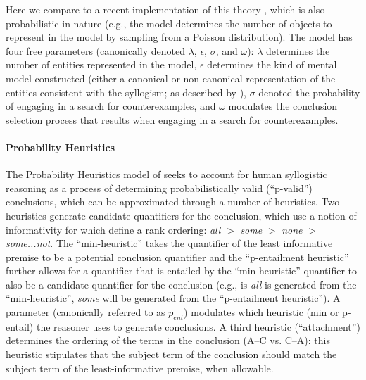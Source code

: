\documentclass[floatsintext, doc]{apa6}
\begin{document}
Here we compare to a recent implementation of this theory \cite<the mReasoner model>{khemlani2013processes}, which is also probabilistic in nature (e.g., the model determines the number of objects to represent in the model by sampling  from a Poisson distribution). 
The model has four free parameters (canonically denoted $\lambda$, $\epsilon$, $\sigma$, and $\omega$): 
$\lambda$ determines the number of entities represented in the model, $\epsilon$ determines the kind of mental model constructed (either a canonical or non-canonical representation of the entities consistent with the syllogism; as described by ), $\sigma$ denoted the probability of engaging in a search for counterexamples, and $\omega$ modulates the conclusion selection process that results when engaging in a search for counterexamples.  
\paragraph{Probability Heuristics} 

The Probability Heuristics model of  seeks to account for human syllogistic reasoning as a process of determining probabilistically valid (``p-valid'') conclusions, which can be approximated through a number of heuristics. 
Two heuristics generate candidate quantifiers for the conclusion, which use a notion of informativity for which  define a rank ordering: \emph{all} $>$ \emph{some} $>$ \emph{none} $>$ \emph{some...not}.  
The ``min-heuristic'' takes the quantifier of the least informative premise to be a potential conclusion quantifier and the ``p-entailment heuristic'' further allows for a quantifier that is entailed by the ``min-heuristic'' quantifier to also be a candidate quantifier for the conclusion (e.g., is \emph{all} is generated from the ``min-heuristic'', \emph{some} will be generated from the ``p-entailment heuristic''). 
A parameter (canonically referred to as $p_{ent}$) modulates which heuristic (min or p-entail) the reasoner uses to generate conclusions. 
A third heuristic (``attachment'') determines the ordering of the terms in the conclusion (A--C vs. C--A): this heuristic stipulates that the subject term of the conclusion should match the subject term of the least-informative premise, when allowable. 
\end{document}
